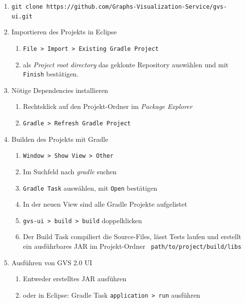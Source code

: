 \documentclass[11pt,a4paper,english,oneside]{book}
\numberwithin{equation}{chapter}
\begin{document}
	\begin{enumerate}
		\item \lstinline{git clone https://github.com/Graphs-Visualization-Service/gvs-ui.git}
		\item Importieren des Projekts in Eclipse
		\begin{enumerate}
			\item \lstinline{File > Import > Existing Gradle Project}
			\item als \textit{Project root directory} das geklonte Repository auswählen und mit \lstinline{Finish} bestätigen.
		\end{enumerate}
		\item Nötige Dependencies installieren
		\begin{enumerate}
			\item Rechtsklick auf den Projekt-Ordner im \textit{Package Explorer}
			\item \lstinline{Gradle > Refresh Gradle Project}
		\end{enumerate}
		\item Builden des Projekts mit Gradle
		\begin{enumerate}
			\item \lstinline{Window > Show View > Other}
			\item Im Suchfeld nach \textit{gradle} suchen
			\item \lstinline{Gradle Task} auswählen, mit \lstinline{Open} bestätigen
			\item In der neuen View sind alle Gradle Projekte aufgelistet
			\item \lstinline{gvs-ui > build > build} doppelklicken
			\item Der Build Task compiliert die Source-Files, lässt Tests laufen und erstellt ein ausführbares JAR im Projekt-Ordner \lstinline{ path/to/project/build/libs}
		\end{enumerate}
		\item Ausführen von GVS 2.0 UI
		\begin{enumerate}
			\item Entweder erstelltes JAR ausführen
			\item oder in Eclipse: Gradle Task \lstinline{application > run} ausführen
		\end{enumerate}
	\end{enumerate}
		
\end{document}
